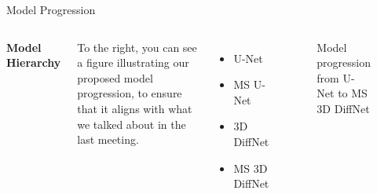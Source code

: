 \documentclass[t,24pt]{beamer}
\begin{document}
\begin{frame}{Model Progression}
    \begin{columns}
        \textbf{Model Hierarchy}
        
        \vspace{0.5cm}
        To the right, you can see a figure illustrating our proposed model progression, to ensure that it aligns with what we talked about in the last meeting.
        \begin{itemize}
            \item U-Net
            \item MS U-Net
            \item 3D DiffNet
            \item MS 3D DiffNet
        \end{itemize}

        \vspace{-1.5cm}
        \begin{figure}
            \centering
            \caption{Model progression from U-Net to MS 3D DiffNet}
            \label{fig:model_progression}
        \end{figure}
    \end{columns}
\end{frame}
\end{document}
